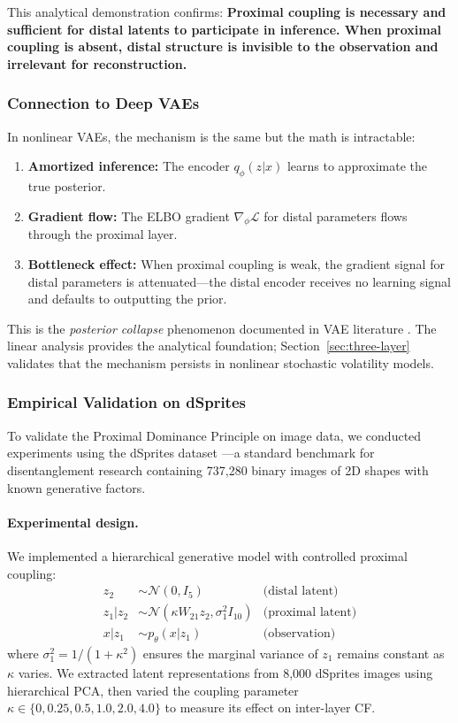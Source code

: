 \documentclass[10pt]{article} %
\theoremstyle{plain}
\theoremstyle{definition}
\begin{document}
This analytical demonstration confirms: \textbf{Proximal coupling is necessary and sufficient for distal latents to participate in inference. When proximal coupling is absent, distal structure is invisible to the observation and irrelevant for reconstruction.}

\subsubsection{Connection to Deep VAEs}

In nonlinear VAEs, the mechanism is the same but the math is intractable:
\begin{enumerate}
    \item \textbf{Amortized inference:} The encoder $q_\phi(z|x)$ learns to approximate the true posterior.
    \item \textbf{Gradient flow:} The ELBO gradient $\nabla_\phi \mathcal{L}$ for distal parameters flows through the proximal layer.
    \item \textbf{Bottleneck effect:} When proximal coupling is weak, the gradient signal for distal parameters is attenuated---the distal encoder receives no learning signal and defaults to outputting the prior.
\end{enumerate}

\noindent This is the \emph{posterior collapse} phenomenon documented in VAE literature \citep{bowman2016generating, he2019lagging}. The linear analysis provides the analytical foundation; Section~\ref{sec:three-layer} validates that the mechanism persists in nonlinear stochastic volatility models.

\subsubsection{Empirical Validation on dSprites}
\label{sec:dsprites}

To validate the Proximal Dominance Principle on image data, we conducted experiments using the dSprites dataset \citep{dsprites17}---a standard benchmark for disentanglement research containing 737,280 binary images of 2D shapes with known generative factors.

\paragraph{Experimental design.} We implemented a hierarchical generative model with controlled proximal coupling:
\begin{align}
z_2 &\sim \mathcal{N}(0, I_5) & \text{(distal latent)} \\
z_1 | z_2 &\sim \mathcal{N}(\kappa W_{21} z_2, \sigma_1^2 I_{10}) & \text{(proximal latent)} \\
x | z_1 &\sim p_\theta(x | z_1) & \text{(observation)}
\end{align}
where $\sigma_1^2 = 1/(1+\kappa^2)$ ensures the marginal variance of $z_1$ remains constant as $\kappa$ varies. We extracted latent representations from 8,000 dSprites images using hierarchical PCA, then varied the coupling parameter $\kappa \in \{0, 0.25, 0.5, 1.0, 2.0, 4.0\}$ to measure its effect on inter-layer CF.
\end{document}
